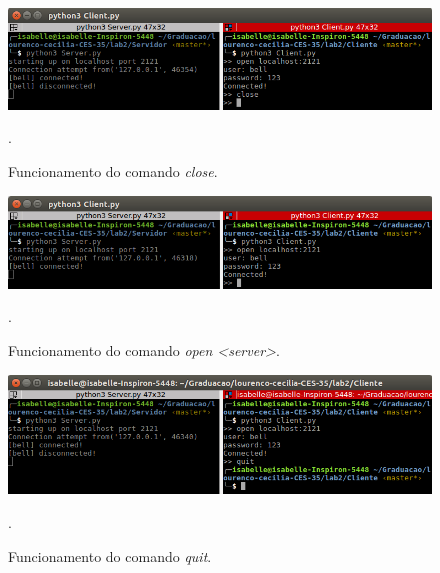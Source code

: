 \documentclass[conference]{IEEEtran}
\begin{document}
\begin{figure}[H]
\centering
\centerline{\includegraphics[scale=0.3]{prints/close.png}}
\caption{Funcionamento do comando \textit{close}.}.
\label{close1}
\end{figure}

\begin{figure}[H]
\centering
\centerline{\includegraphics[scale=0.3]{prints/open1.png}}
\caption{Funcionamento do comando \textit{open <server>}.}.
\label{open1}
\end{figure}

\begin{figure}[H]
\centering
\centerline{\includegraphics[scale=0.3]{prints/quit1.png}}
\caption{Funcionamento do comando \textit{quit}.}.
\label{quit1}
\end{figure}
\end{document}
